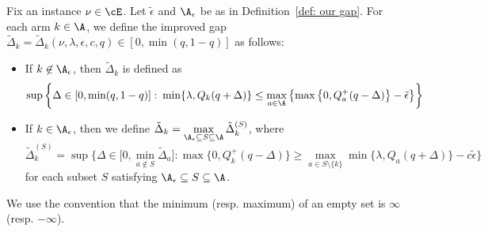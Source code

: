 \begin{definition}
\label{def: modified gap}
     Fix an instance $\nu \in \cE$.
     Let $\tilde{\epsilon}$ and $\A_{\epsilon}$ be as in Definition~\ref{def: our gap}.
    For each arm $k \in \A$, we define the improved gap $\tilde{\Delta}_{k} =
    \tilde{\Delta}_{k}(\nu, \lambda, \epsilon, c, q) \in \left[0, \min(q, 1-q) \right]$ as follows: 
    \begin{itemize}
        \item  
        
        If $k \not\in \A_{\epsilon}$, then $\tilde{\Delta}_{k}$ is defined as
        \begin{equation}
            \sup
            \left\{
                \Delta 
                \in \left[0, \min(q, 1-q) \right]
                \colon
               \min\{\lambda, Q_k(q + \Delta)   \}
                \le
                 \max\limits_{a \in \A  }
                 \left\{
                 \max\left\{0,  Q^+_{a}(q - \Delta) \right\}  - \tilde{\epsilon} 
                 \right\}
                \right\}
        \end{equation}

        \item

             If $k \in \A_{\epsilon}$, then we define $\tilde{\Delta}_{k} = \max\limits_{\A_{\epsilon} \subseteq S \subseteq \A}
        \tilde{\Delta}_{k}^{(S)}$, where 
        \begin{equation}
        \label{eq: improved Delta k^S}
            \tilde{\Delta}_{k}^{(S)} =
           \sup
            \Big\{
                \Delta \in 
               \Big[0, \min_{a \not\in S} \tilde{\Delta}_{a}  \Big]
                :
                \max\{0, Q^+_{k}(q - \Delta)\}
                \ge 
                \max\limits_{ a \in S \setminus \{k\}} 
                \min\{\lambda, Q_{a}(q + \Delta)\} - c \tilde{\epsilon}
                \Big\}
        \end{equation}
        for each subset $S$ satisfying $\A_{\epsilon} \subseteq S \subseteq \A$.
                    
    \end{itemize}
We use the convention that the minimum  (resp. maximum) of an empty set is $\infty$ (resp. $- \infty$).
\end{definition}

